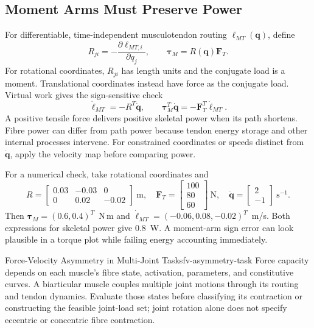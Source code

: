\subsection{Moment Arms Must Preserve Power}

For differentiable, time-independent musculotendon routing
$\bm\ell_{MT}(\bm q)$, define
\begin{equation}
 R_{ji}=-\frac{\partial\ell_{MT,i}}{\partial q_j},\qquad
 \bm\tau_M=R(\bm q)\bm F_T .
 \label{eq:ch1:muscle-torque}
\end{equation}
For rotational coordinates, $R_{ji}$ has length units and the conjugate
load is a moment. Translational coordinates instead have force as the
conjugate load. Virtual work gives the sign-sensitive check
\[
 \dot{\bm\ell}_{MT}=-R^T\dot{\bm q},\qquad
 \bm\tau_M^T\dot{\bm q}=-\bm F_T^T\dot{\bm\ell}_{MT}.
\]
A positive tensile force delivers positive skeletal power when its path
shortens. Fibre power can differ from path power because tendon energy storage
and other internal processes intervene. For constrained coordinates or speeds
distinct from $\dot{\bm q}$, apply the velocity map before comparing power.

For a numerical check, take rotational coordinates and
\[
 R=\begin{bmatrix}0.03&-0.03&0\\0&0.02&-0.02\end{bmatrix}\ \mathrm m,
 \quad\bm F_T=\begin{bmatrix}100\\80\\60\end{bmatrix}\ \mathrm N,
 \quad\dot{\bm q}=\begin{bmatrix}2\\-1\end{bmatrix}\ \mathrm{s}^{-1}.
\]
Then $\bm\tau_M=(0.6,0.4)^T$~N\,m and
$\dot{\bm\ell}_{MT}=(-0.06,0.08,-0.02)^T$~m/s. Both expressions for
skeletal power give $0.8$~W. A moment-arm sign error can look plausible in
a torque plot while failing energy accounting immediately.

\begin{principle}{Force-Velocity Asymmetry in Multi-Joint Tasks}{fv-asymmetry-task}
Force capacity depends on each muscle's fibre state, activation, parameters,
and constitutive curves. A biarticular muscle couples multiple joint motions
through its routing and tendon dynamics. Evaluate those states before
classifying its contraction or constructing the feasible joint-load set;
joint rotation alone does not specify eccentric or concentric fibre contraction.
\end{principle}

